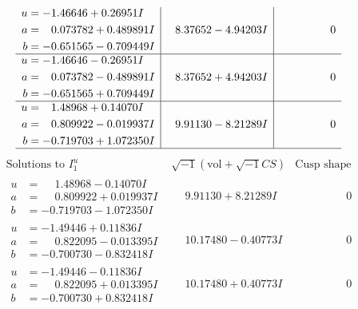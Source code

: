 \documentclass[1p]{elsarticle_modified}
\theoremstyle{definition}
\newcommand{\I}{\sqrt{-1}}
\begin{document}
$$\begin{array}{c|c|c}
\begin{aligned}
u &= -1.46646 + 0.26951 I \\
a &= \phantom{-}0.073782 + 0.489891 I \\
b &= -0.651565 - 0.709449 I\end{aligned}
 & \phantom{-}8.37652 - 4.94203 I & \phantom{-0.000000 } 0 \\ \hline\begin{aligned}
u &= -1.46646 - 0.26951 I \\
a &= \phantom{-}0.073782 - 0.489891 I \\
b &= -0.651565 + 0.709449 I\end{aligned}
 & \phantom{-}8.37652 + 4.94203 I & \phantom{-0.000000 } 0 \\ \hline\begin{aligned}
u &= \phantom{-}1.48968 + 0.14070 I \\
a &= \phantom{-}0.809922 - 0.019937 I \\
b &= -0.719703 + 1.072350 I\end{aligned}
 & \phantom{-}9.91130 - 8.21289 I & \phantom{-0.000000 } 0\\
 \hline 
 \end{array}$$\newpage$$\begin{array}{c|c|c}  
\text{Solutions to }I^u_{1}& \I (\text{vol} + \sqrt{-1}CS) & \text{Cusp shape}\\
 \hline 
\begin{aligned}
u &= \phantom{-}1.48968 - 0.14070 I \\
a &= \phantom{-}0.809922 + 0.019937 I \\
b &= -0.719703 - 1.072350 I\end{aligned}
 & \phantom{-}9.91130 + 8.21289 I & \phantom{-0.000000 } 0 \\ \hline\begin{aligned}
u &= -1.49446 + 0.11836 I \\
a &= \phantom{-}0.822095 - 0.013395 I \\
b &= -0.700730 - 0.832418 I\end{aligned}
 & \phantom{-}10.17480 - 0.40773 I & \phantom{-0.000000 } 0 \\ \hline\begin{aligned}
u &= -1.49446 - 0.11836 I \\
a &= \phantom{-}0.822095 + 0.013395 I \\
b &= -0.700730 + 0.832418 I\end{aligned}
 & \phantom{-}10.17480 + 0.40773 I & \phantom{-0.000000 } 0 \\ \hline\begin{aligned}

\end{aligned}
\end{array}$$
\end{document}
